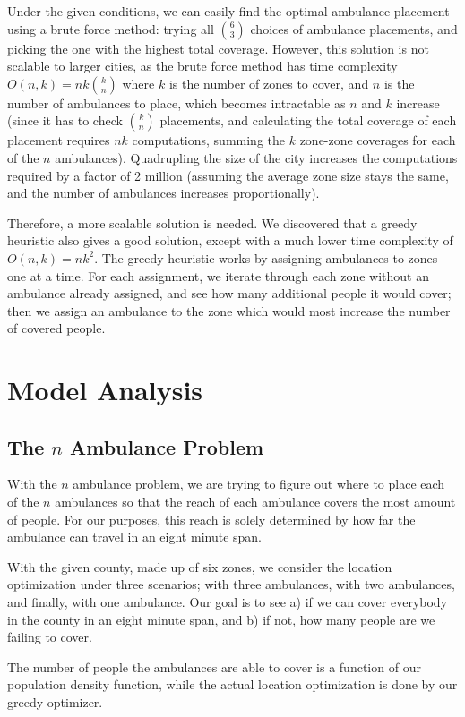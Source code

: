 \documentclass[notitlepage, 12pt]{article}
\begin{document}
Under the given conditions, we can easily find the optimal ambulance placement using a brute force
method: trying all $\binom{6}{3}$ choices of ambulance placements, and picking the one with the highest total coverage.
However, this solution is not scalable to larger cities, as the brute force method has time complexity
$O(n, k) = nk\binom{k}{n}$ where $k$ is the number of zones to cover, and $n$ is the number of ambulances to place, which
becomes intractable as $n$ and $k$ increase (since it has to check $\binom{k}{n}$ placements,
and calculating the total coverage of each placement requires $nk$ computations, summing the $k$ zone-zone
coverages for each of the $n$ ambulances). Quadrupling the size of the city
increases the computations required by a factor of 2 million (assuming the average zone size stays the same,
and the number of ambulances increases proportionally).

Therefore, a more scalable solution is needed. We discovered that a greedy heuristic also gives a good solution,
except with a much lower time complexity of $O(n, k) = n k^2$. The greedy heuristic works by assigning ambulances to zones
one at a time. For each assignment, we iterate through each zone without an ambulance already assigned, and see how many
additional people it would cover; then we assign an ambulance to the zone which would most increase the number of
covered people.

\section{Model Analysis}

\subsection{The $n$ Ambulance Problem}
With the $n$ ambulance problem, we are trying to figure out where to place each of the $n$ ambulances so that the reach of each ambulance covers the most amount of people. For our purposes, this reach is solely determined by how far the ambulance can travel in an eight minute span.

With the given county, made up of six zones, we consider the location optimization under three scenarios; with three ambulances, with two ambulances, and finally, with one ambulance. Our goal is to see a) if we can cover everybody in the county in an eight minute span, and b) if not, how many people are we failing to cover.

The number of people the ambulances are able to cover is a function of our population density function, while the actual location optimization is done by our greedy optimizer.
\end{document}
